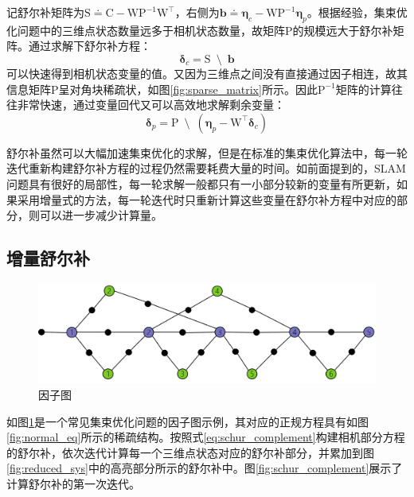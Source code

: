 记舒尔补矩阵为$\mathrm{S}\doteq\mathrm{C}-\mathrm{W}\mathrm{P}^{-1}\mathrm{W}^\top$，右侧为$\bm{b}\doteq{\bm{\eta}_c-\mathrm{W}\mathrm{P}^{-1}\bm{\eta}_p}$。根据经验，集束优化问题中的三维点状态数量远多于相机状态数量，故矩阵$\mathrm{P}$的规模远大于舒尔补矩阵。通过求解下舒尔补方程：
\begin{equation}
    \bm{\delta}_c = \mathrm{S} \enspace\setminus\enspace \bm{b}
    \label{eq:solve_schur}
\end{equation}
可以快速得到相机状态变量的值。又因为三维点之间没有直接通过因子相连，故其信息矩阵$\mathrm{P}$呈对角块稀疏状，如图\ref{fig:sparse_matrix}所示。因此$\mathrm{P}^{-1}$矩阵的计算往往非常快速，通过变量回代又可以高效地求解剩余变量：
\begin{equation}
    \bm{\delta}_p = \mathrm{P}
    \enspace\setminus\enspace
    \left( \bm{\eta}_p-\mathrm{W}^\top\bm{\delta}_c \right)
    \label{eq:back_sub}
\end{equation}

舒尔补虽然可以大幅加速集束优化的求解，但是在标准的集束优化算法中，每一轮迭代重新构建舒尔补方程的过程仍然需要耗费大量的时间。如前面提到的，SLAM问题具有很好的局部性，每一轮求解一般都只有一小部分较新的变量有所更新，如果采用增量式的方法，每一轮迭代时只重新计算这些变量在舒尔补方程中对应的部分，则可以进一步减少计算量。

\subsection{增量舒尔补}

\begin{figure}[htb!]
    \centering
    \includegraphics[width=.8\textwidth]{figs/factor_graph.png}
    \caption{因子图}
    \label{fig:factor_graph}
\end{figure}

如图\ref{fig:factor_graph}是一个常见集束优化问题的因子图示例，其对应的正规方程具有如图\ref{fig:normal_eq}所示的稀疏结构。按照式\eqref{eq:schur_complement}构建相机部分方程的舒尔补，依次迭代计算每一个三维点状态对应的舒尔补部分，并累加到图\ref{fig:reduced_sys}中的高亮部分所示的舒尔补中。图\ref{fig:schur_complement}展示了计算舒尔补的第一次迭代。

